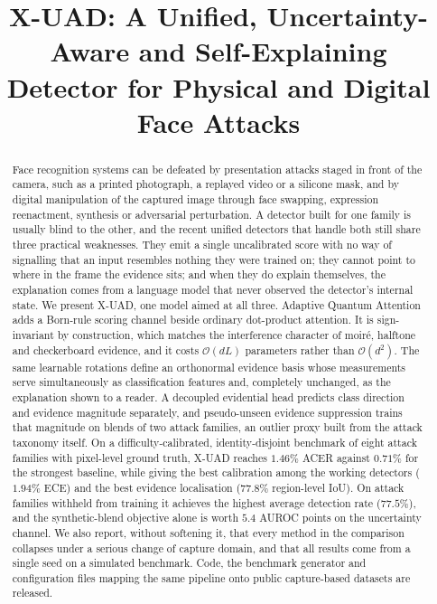 \documentclass[conference]{IEEEtran}
\begin{document}
\title{X-UAD: A Unified, Uncertainty-Aware and Self-Explaining Detector for
Physical and Digital Face Attacks}

\author{}

\maketitle

\begin{abstract}
Face recognition systems can be defeated by presentation attacks staged in front
of the camera, such as a printed photograph, a replayed video or a silicone mask,
and by digital manipulation of the captured image through face swapping,
expression reenactment, synthesis or adversarial perturbation. A detector built for
one family is usually blind to the other, and the recent unified detectors that
handle both still share three practical weaknesses. They emit a single uncalibrated
score with no way of signalling that an input resembles nothing they were trained
on; they cannot point to where in the frame the evidence sits; and when they do
explain themselves, the explanation comes from a language model that never observed
the detector's internal state. We present X-UAD, one model aimed at all three.
Adaptive Quantum Attention adds a Born-rule scoring channel beside ordinary
dot-product attention. It is sign-invariant by construction, which matches the
interference character of moir\'e, halftone and checkerboard evidence, and it costs
$\mathcal{O}(dL)$ parameters rather than $\mathcal{O}(d^{2})$. The same learnable
rotations define an orthonormal evidence basis whose measurements serve
simultaneously as classification features and, completely unchanged, as the
explanation shown to a reader. A decoupled evidential head predicts class direction
and evidence magnitude separately, and pseudo-unseen evidence suppression trains
that magnitude on blends of two attack families, an outlier proxy built from the
attack taxonomy itself. On a difficulty-calibrated, identity-disjoint benchmark of
eight attack families with pixel-level ground truth, X-UAD reaches $1.46\%$ ACER
against $0.71\%$ for the strongest baseline, while giving the best calibration among
the working detectors ($1.94\%$ ECE) and the best evidence localisation ($77.8\%$
region-level IoU). On attack families withheld from training it achieves the
highest average detection rate ($77.5\%$), and the synthetic-blend objective alone
is worth $5.4$ AUROC points on the uncertainty channel. We also report, without
softening it, that every method in the comparison collapses under a serious change
of capture domain, and that all results come from a single seed on a simulated
benchmark. Code, the benchmark generator and configuration files mapping the same
pipeline onto public capture-based datasets are released.
\end{abstract}
\end{document}
